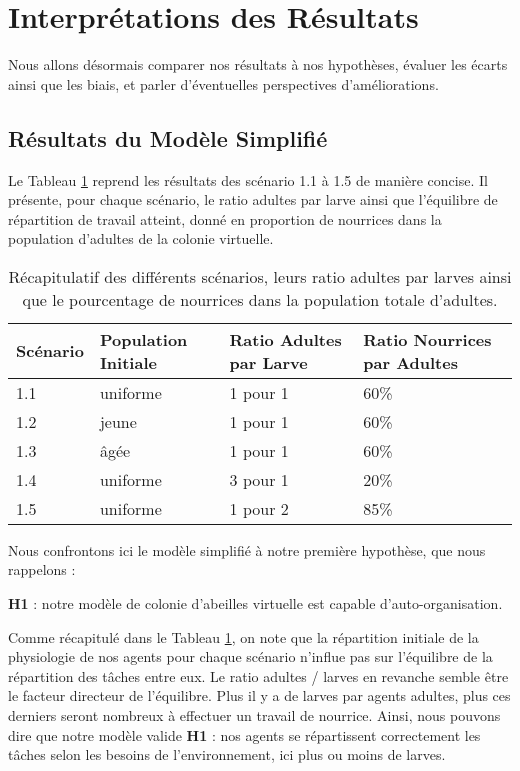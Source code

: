 	
	\section{Interprétations des Résultats}

	Nous allons désormais comparer nos résultats à nos hypothèses, évaluer les écarts ainsi que les biais, et parler d'éventuelles perspectives d'améliorations.
	
	\subsection{Résultats du Modèle Simplifié}
	
	Le Tableau \ref{TabEnvConstant} reprend les résultats des scénario 1.1 à 1.5 de manière concise. Il présente, pour chaque scénario, le ratio adultes par larve ainsi que l'équilibre de répartition de travail atteint, donné en proportion de nourrices dans la population d'adultes de la colonie virtuelle.
	
	\begin{table}
		\centering
		\begin{tabular}{l|l|l|l}
    	Scénario & Population Initiale & Ratio Adultes par Larve & Ratio Nourrices par Adultes \\
   		\hline
   		1.1 & uniforme & 1 pour 1 & 60\% \\
   		1.2 & jeune & 1 pour 1 & 60\% \\
   		1.3 & âgée & 1 pour 1 & 60\% \\
   		1.4 & uniforme & 3 pour 1 & 20\% \\
   		1.5 & uniforme & 1 pour 2 & 85\% \\
		\end{tabular}	
		\caption{Récapitulatif des différents scénarios, leurs ratio adultes par larves ainsi que le pourcentage de nourrices dans la population totale d'adultes.}	
   		\label{TabEnvConstant}
	\end{table}	
	
		Nous confrontons ici le modèle simplifié à notre première hypothèse, que nous rappelons :
				
		\textbf{H1} : notre modèle de colonie d'abeilles virtuelle est capable d'auto-organisation.
		
		Comme récapitulé dans le Tableau \ref{TabEnvConstant}, on note que la répartition initiale de la physiologie de nos agents pour chaque scénario n'influe pas sur l'équilibre de la répartition des tâches entre eux. Le ratio adultes / larves en revanche semble être le facteur directeur de l'équilibre. Plus il y a de larves par agents adultes, plus ces derniers seront nombreux à effectuer un travail de nourrice. Ainsi, nous pouvons dire que notre modèle valide \textbf{H1} : nos agents se répartissent correctement les tâches selon les besoins de l'environnement, ici plus ou moins de larves.
		
